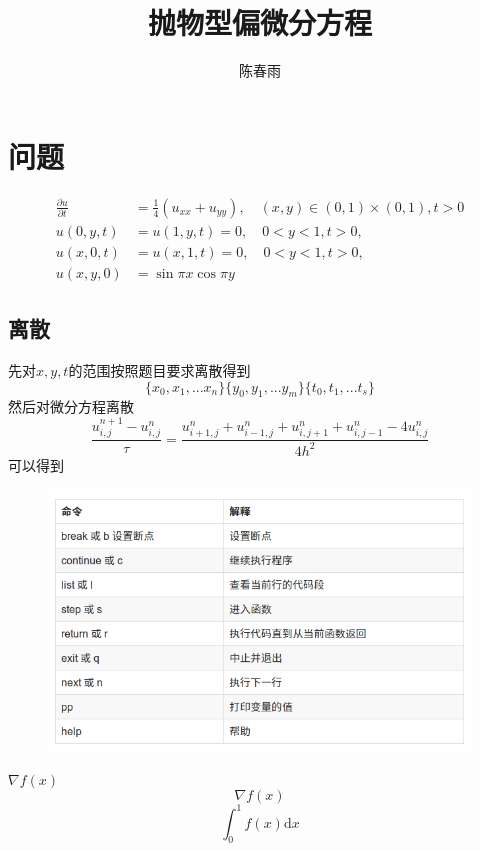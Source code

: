 \documentclass[12pt,a4paper]{article}
\title{ 抛物型偏微分方程}
\author{ 陈春雨}
\date{\chntoday}
\begin{document}
\maketitle
\newpage
\section{问题}

\begin{align*}
\frac{\partial u}{\partial t} &=\frac{1}{4}(u_{xx}+u_{yy}),\quad (x,y)\in (0,1)\times (0,1),t>0 \\
u(0,y,t) &=u(1,y,t)=0,\quad 0<y<1,t>0,\\
u(x,0,t) &=u(x,1,t)=0,\quad 0<y<1,t>0,\\
u(x,y,0) &=\sin\pi x\cos \pi y
\end{align*}
\subsection{ 离散}
先对$x,y,t$的范围按照题目要求离散得到
$$
\{x_0,x_1,...x_n\}
\{y_0,y_1,...y_m\}
\{t_0,t_1,...t_s\}
$$
然后对微分方程离散
$$
\frac{u_{i,j}^{n+1}-u_{i,j}^{n}}{\tau}=\frac{u_{i+1,j}^{n}+u_{i-1,j}^{n}+u_{i,j+1}^{n}+u_{i,j-1}^{n}-4u_{i,j}^{n}}{4h^2}
$$
可以得到
$$

$$
\begin{figure}[H]
\centering
\includegraphics[scale=0.5]{./figures/Figure_1.png}
\end{figure}
$\nabla f(x)$
$$\nabla f(x)$$
\begin{equation}
    \int_0^1f(x)\mathrm{d}x
\end{equation}
\end{document}
